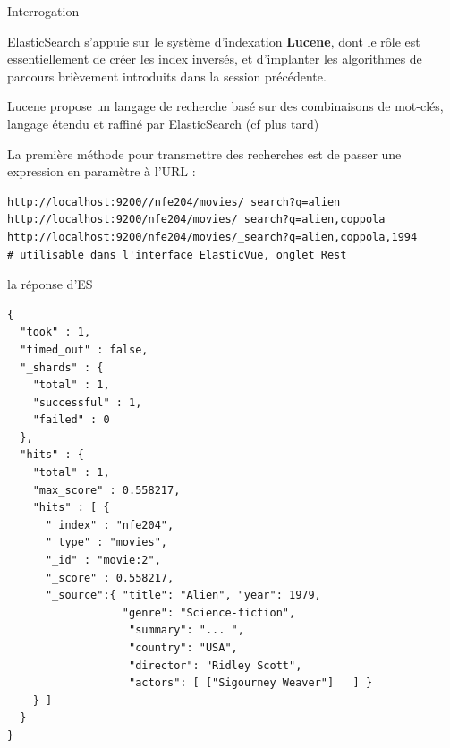 \begin{frame}[fragile]{Interrogation}
  \begin{redbullet}
    \item ElasticSearch s’appuie sur le système d’indexation \textbf{Lucene},
      dont le rôle est essentiellement de créer les index inversés, et
      d’implanter les algorithmes de parcours brièvement introduits dans la
      session précédente. 

\item Lucene propose un langage de recherche basé sur des combinaisons de
  mot-clés, langage étendu et raffiné par ElasticSearch (cf plus tard)
\item La première méthode pour transmettre des recherches est de passer une
  expression en paramètre à l’URL :
\begin{verbatim}
http://localhost:9200//nfe204/movies/_search?q=alien
http://localhost:9200/nfe204/movies/_search?q=alien,coppola
http://localhost:9200/nfe204/movies/_search?q=alien,coppola,1994
# utilisable dans l'interface ElasticVue, onglet Rest
\end{verbatim}

\end{redbullet}
\end{frame}

\begin{frame}[fragile]{la réponse d'ES}
	\begin{verbatim}
{
  "took" : 1,
  "timed_out" : false,
  "_shards" : {
    "total" : 1,
    "successful" : 1,
    "failed" : 0
  },
  "hits" : {
    "total" : 1,
    "max_score" : 0.558217,
    "hits" : [ {
      "_index" : "nfe204",
      "_type" : "movies",
      "_id" : "movie:2",
      "_score" : 0.558217,
      "_source":{ "title": "Alien", "year": 1979, 
                  "genre": "Science-fiction",
                   "summary": "... ", 
                   "country": "USA", 
                   "director": "Ridley Scott", 
                   "actors": [ ["Sigourney Weaver"]   ] }
    } ]
  }
}

\end{verbatim} 
\end{frame} 


